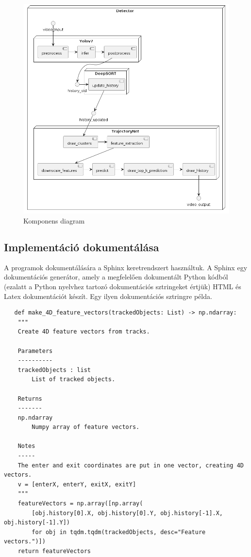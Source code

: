 \documentclass[12pt,a4paper]{article}
\begin{document}
\begin{figure}[H]
    \includegraphics[width=1\columnwidth]{ComponentDiagramDetection.png}
    \caption{Komponens diagram}
    \label{fig:ComponentDiagram}
\end{figure}


\newpage
\subsection{Implementáció dokumentálása}
A programok dokumentálására a Sphinx \cite{brandl2021sphinx} keretrendszert használtuk. A Sphinx egy dokumentációs generátor, amely a megfelelően dokumentált
Python kódból (ezalatt a Python nyelvhez tartozó dokumentációs sztringeket értjük) HTML és Latex dokumentációt készít. Egy ilyen dokumentációs sztringre példa.

\begin{verbatim}
   def make_4D_feature_vectors(trackedObjects: List) -> np.ndarray:
    """
    Create 4D feature vectors from tracks.

    Parameters
    ----------
    trackedObjects : list
        List of tracked objects.

    Returns
    -------
    np.ndarray
        Numpy array of feature vectors.

    Notes
    -----
    The enter and exit coordinates are put in one vector, creating 4D vectors.
    v = [enterX, enterY, exitX, exitY]
    """
    featureVectors = np.array([np.array(
        [obj.history[0].X, obj.history[0].Y, obj.history[-1].X, obj.history[-1].Y])
        for obj in tqdm.tqdm(trackedObjects, desc="Feature vectors.")])
    return featureVectors 
\end{verbatim}
\end{document}

